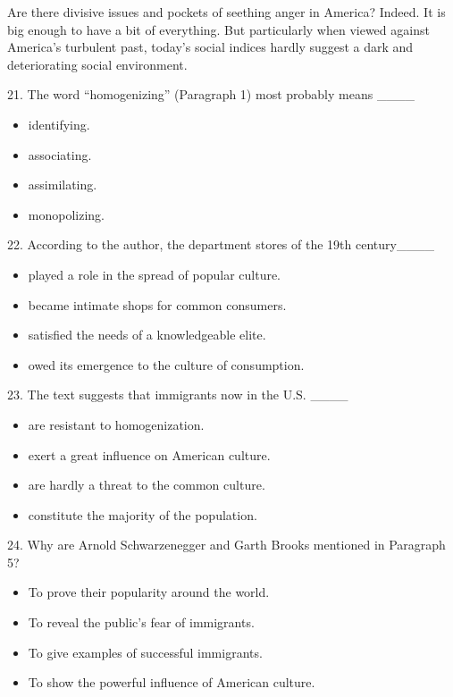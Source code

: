 \documentclass[UTF8,11pt]{ctexart}
\begin{document}
Are there divisive issues and pockets of seething anger in America? Indeed. It is big enough to have a bit of everything. But particularly when viewed against America’s turbulent past, today’s social indices hardly suggest a dark and deteriorating social environment.


21. The word “homogenizing” (Paragraph 1) most probably means \_\_\_\_


\begin{itemize}[leftmargin=2em,itemsep=.2em,topsep=.4em]\item[A.] identifying.
\item[B.] associating.
\item[C.] assimilating.
\item[D.] monopolizing.
\end{itemize}

22. According to the author, the department stores of the 19th century\_\_\_\_


\begin{itemize}[leftmargin=2em,itemsep=.2em,topsep=.4em]\item[A.] played a role in the spread of popular culture.
\item[B.] became intimate shops for common consumers.
\item[C.] satisfied the needs of a knowledgeable elite.
\item[D.] owed its emergence to the culture of consumption.
\end{itemize}

23. The text suggests that immigrants now in the U.S. \_\_\_\_


\begin{itemize}[leftmargin=2em,itemsep=.2em,topsep=.4em]\item[A.] are resistant to homogenization.
\item[B.] exert a great influence on American culture.
\item[C.] are hardly a threat to the common culture.
\item[D.] constitute the majority of the population.
\end{itemize}

24. Why are Arnold Schwarzenegger and Garth Brooks mentioned in Paragraph 5?


\begin{itemize}[leftmargin=2em,itemsep=.2em,topsep=.4em]\item[A.] To prove their popularity around the world.
\item[B.] To reveal the public’s fear of immigrants.
\item[C.] To give examples of successful immigrants.
\item[D.] To show the powerful influence of American culture.
\end{itemize}
\end{document}

